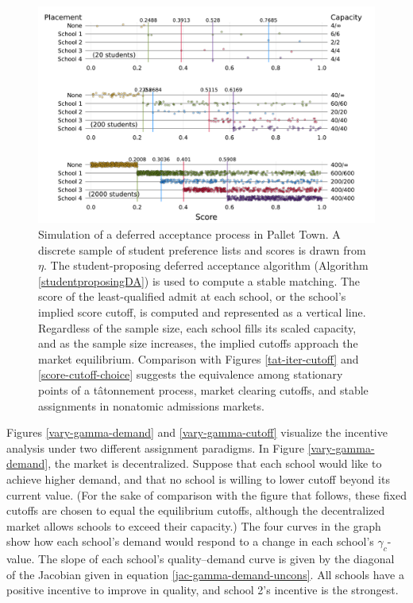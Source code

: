 \documentclass[12pt]{article}
\numberwithin{equation}{subsection}
\theoremstyle{definition}
\begin{document}
\begin{figure}
\begin{center}\includegraphics[width=\linewidth, ]{plots/score-DA-placement.pdf}\end{center}
\captionsetup{singlelinecheck=off}
    \caption[.]{Simulation of a deferred acceptance process in Pallet Town. A discrete sample of student preference lists and scores is drawn from $\eta$. The student-proposing deferred acceptance algorithm (Algorithm \ref{studentproposingDA}) is used to compute a stable matching. The score of the least-qualified admit at each school, or the school's implied score cutoff, is computed and represented as a vertical line. Regardless of the sample size, each school fills its scaled capacity, and as the sample size increases, the implied cutoffs approach the market equilibrium. Comparison with Figures \ref{tat-iter-cutoff} and \ref{score-cutoff-choice} suggests the equivalence among stationary points of a t\^{a}tonnement process, market clearing cutoffs, and stable assignments in nonatomic admissions markets.}
\label{score-DA-placement}
\end{figure}


Figures \ref{vary-gamma-demand} and \ref{vary-gamma-cutoff} visualize the incentive analysis under two different assignment paradigms. In Figure \ref{vary-gamma-demand}, the market is decentralized. Suppose that each school would like to achieve higher demand, and that no school is willing to lower cutoff beyond its current value. (For the sake of comparison with the figure that follows, these fixed cutoffs are chosen to equal the equilibrium cutoffs, although the decentralized market allows schools to exceed their capacity.) The four curves in the graph show how each school's demand would respond to a change in each school's $\gamma_c$-value. The slope of each school's quality--demand curve is given by the diagonal of the Jacobian given in equation \eqref{jac-gamma-demand-uncons}. All schools have a positive incentive to improve in quality, and school 2's incentive is the strongest.
\end{document}
